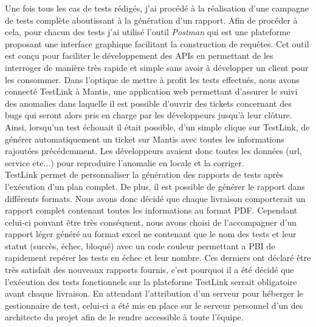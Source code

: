 	Une fois tous les cas de tests rédigés, j'ai procédé à la réalisation d'une campagne de tests complète aboutissant à la génération d'un rapport. Afin de procéder à cela, pour chacun des tests j'ai utilisé l'outil \textit{Postman} qui est une plateforme proposant une interface graphique facilitant la construction de requêtes. Cet outil est conçu pour faciliter le développement des APIs en permettant de les interroger de manière très rapide et simple sans avoir à développer un client pour les consommer. Dans l'optique de mettre à profit les tests effectués, nous avons connecté TestLink à Mantis, une application web permettant d'assurer le suivi des anomalies dans laquelle il est possible d'ouvrir des tickets concernant des bugs qui seront alors pris en charge par les développeurs jusqu'à leur clôture. Ainsi, lorsqu'un test échouait il était possible, d'un simple clique sur TestLink, de générer automatiquement un ticket sur Mantis avec toutes les informations rajoutées précédemment. Les développeurs avaient donc toutes les données (url, service etc...) pour reproduire l'anomalie en locale et la corriger. \\
	
	TestLink permet de personnaliser la génération des rapports de tests après l'exécution d'un plan complet. De plus, il est possible de générer le rapport dans différents formats. Nous avons donc décidé que chaque livraison comporterait un rapport complet contenant toutes les informations au format PDF. Cependant celui-ci pouvant être très conséquent, nous avons choisi de l'accompagner d'un rapport léger généré au format excel ne contenant que le nom des tests et leur statut (succès, échec, bloqué) avec un code couleur permettant a PBI de rapidement repérer les tests en échec et leur nombre. Ces derniers ont déclaré être très satisfait des nouveaux rapports fournis, c'est pourquoi il a été décidé que l'exécution des tests fonctionnels sur la plateforme TestLink serrait obligatoire avant chaque livraison. En attendant l'attribution d'un serveur pour héberger le gestionnaire de test, celui-ci a été mis en place sur le serveur personnel d'un des architecte du projet afin de le rendre accessible à toute l'équipe. \\
	
